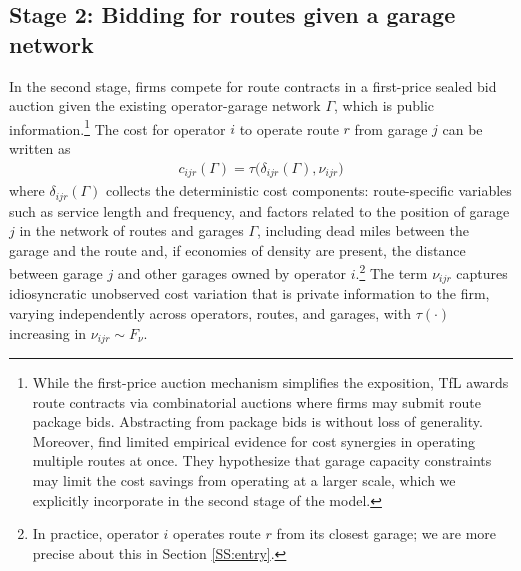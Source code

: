 \documentclass[12pt]{article}
\begin{document}
\subsection{Stage 2: Bidding for routes given a garage network}\label{SS:bidding}
In the second stage, firms compete for route contracts in a first-price sealed 
bid auction given the existing operator-garage network $\Gamma$, which is 
public information.\footnote{While the first-price auction mechanism simplifies 
the exposition, TfL awards route contracts via combinatorial auctions where 
firms may submit route package bids. Abstracting from package bids is without 
loss of generality. Moreover, \cite{Cantillon2007} find limited empirical 
evidence for cost synergies in operating multiple routes at once. They 
hypothesize that garage capacity constraints may limit the cost savings from 
operating at a larger scale, which we explicitly incorporate in the second 
stage of the model.} The cost for operator $i$ to operate route $r$ from 
garage $j$ can be written as
\begin{align}\label{eq:routecost}
c_{ijr}(\Gamma) = \tau\big(\delta_{ijr}(\Gamma), \nu_{ijr}\big)
\end{align}
where $\delta_{ijr}(\Gamma)$ collects the deterministic cost components: 
route-specific variables such as service length and frequency, and factors 
related to the position of garage $j$ in the network of routes and garages 
$\Gamma$, including dead miles between the garage and the route and, if 
economies of density are present, the distance between garage $j$ and other 
garages owned by operator $i$.\footnote{In practice, operator $i$ operates 
route $r$ from its closest garage; we are more precise about this in Section 
\ref{SS:entry}.} The term $\nu_{ijr}$ captures idiosyncratic unobserved cost 
variation that is private information to the firm, varying independently across 
operators, routes, and garages, with $\tau(\cdot)$ increasing in $\nu_{ijr} 
\sim F_{\nu}$.
\end{document}
